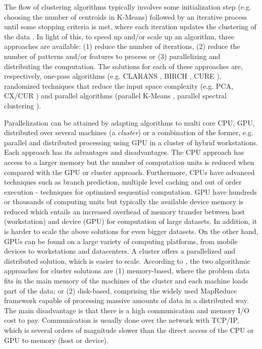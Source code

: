 The flow of clustering algorithms typically involves some initialization step (e.g. choosing the number of centroids in K-Means) followed by an iterative process until some stopping criteria is met, where each iteration updates the clustering of the data \cite{Aggarwal2014}.
In light of this, to speed up and/or scale up an algorithm, three approaches are available: (1) reduce the number of iterations, (2) reduce the number of patterns and/or features to process or (3) parallelizing and distributing the computation.
The solutions for each of these approaches are, respectively, one-pass algorithms (e.g. CLARANS \cite{ng2002clarans}, BIRCH \cite{zhang1996birch}, CURE \cite{guha1998cure}), randomized techniques that reduce the input space complexity (e.g. PCA, CX/CUR \cite{drineas2006fast}) and parallel algorithms (parallel K-Means \cite{Zechner2009b}, parallel spectral clustering \cite{chen2011parallel}).


Parallelization can be attained by adapting algorithms to multi core CPU, GPU, distributed over several machines (a \emph{cluster}) or a combination of the former, e.g. parallel and distributed processing using GPU in a cluster of hybrid workstations.
Each approach has its advantages and disadvantages.
The CPU approach has access to a larger memory but the number of computation units is reduced when compared with the GPU or cluster approach.
Furthermore, CPUs have advanced techniques such as branch prediction, multiple level caching and out of order execution - techniques for optimized sequential computation.
GPU have hundreds or thousands of computing units but typically the available device memory is reduced which entails an increased overhead of memory transfer between host (workstation) and device (GPU) for computation of large datasets.
In addition, it is harder to scale the above solutions for even bigger datasets.
On the other hand, GPUs can be found on a large variety of computing platforms, from mobile devices to workstations and datacenters.
A cluster offers a parallelized and distributed solution, which is easier to scale.
According to \cite{Aggarwal2014}, the two algorithmic approaches for cluster solutions are (1) memory-based, where the problem data fits in the main memory of the machines of the cluster and each machine loads part of the data; or (2) disk-based, comprising the widely used MapReduce framework capable of processing massive amounts of data in a distributed way.
The main disadvantage is that there is a high communication and memory I/O cost to pay.
Communication is usually done over the network with TCP/IP, which is several orders of magnitude slower than the direct access of the CPU or GPU to memory (host or device).

